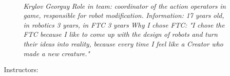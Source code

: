 \begin{figure}[H]
\begin{minipage}[h]{0.47\linewidth}
		\\
		\emph{Krylov Georguy}
			\emph{Role in team: coordinator of the action operators in game, responsible for robot modification.}
			\emph{Information: 17 years old, in robotics 3 years, in FTC 3 years }
				\emph{Why I chose FTC: "I chose the FTC because I like to come up with the design of robots and turn their ideas into reality, because every time I feel like a Creator who made a new creature."}
	\end{minipage}
\end{figure}

\newpage

\large  Instructors:


